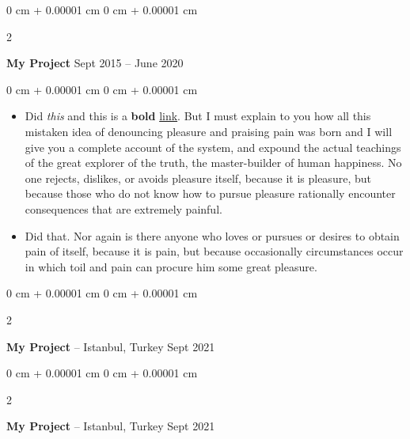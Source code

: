 \documentclass[10pt, letterpaper]{article}
\newenvironment{highlights}{
    \begin{itemize}[
        topsep=0.10 cm,
        parsep=0.10 cm,
        partopsep=0pt,
        itemsep=0pt,
        leftmargin=0 cm + 10pt
    ]
}{
    \end{itemize}
} %
\newenvironment{onecolentry}{
    \begin{adjustwidth}{
        0 cm + 0.00001 cm
    }{
        0 cm + 0.00001 cm
    }
}{
    \end{adjustwidth}
} %
\newenvironment{twocolentry}[2][]{
    \onecolentry
    \def\secondColumn{#2}
    \setcolumnwidth{\fill, 4.5 cm}
    \begin{paracol}{2}
}{
    \switchcolumn \raggedleft \secondColumn
    \end{paracol}
    \endonecolentry
} %
\begin{document}
        \vspace{0.2 cm}

        \begin{twocolentry}{
            Sept 2015 – June 2020
        }
            \textbf{My Project}\end{twocolentry}

        \vspace{0.10 cm}
        \begin{onecolentry}
            \begin{highlights}
                \item Did \textit{this} and this is a \textbf{bold} \href{https://example.com}{link}. But I must explain to you how all this mistaken idea of denouncing pleasure and praising pain was born and I will give you a complete account of the system, and expound the actual teachings of the great explorer of the truth, the master-builder of human happiness. No one rejects, dislikes, or avoids pleasure itself, because it is pleasure, but because those who do not know how to pursue pleasure rationally encounter consequences that are extremely painful.
                \item Did that. Nor again is there anyone who loves or pursues or desires to obtain pain of itself, because it is pain, but because occasionally circumstances occur in which toil and pain can procure him some great pleasure.
            \end{highlights}
        \end{onecolentry}


        \vspace{0.2 cm}

        \begin{twocolentry}{
            Sept 2021
        }
            \textbf{My Project} -- Istanbul, Turkey\end{twocolentry}



        \vspace{0.2 cm}

        \begin{twocolentry}{
            Sept 2021
        }
            \textbf{My Project} -- Istanbul, Turkey\end{twocolentry}
\end{document}
